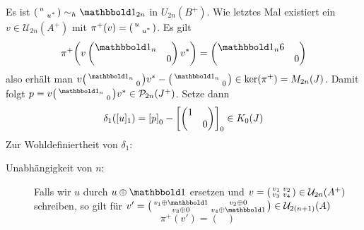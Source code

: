 \begin{beweis}[Idee]
	Es ist $\begin{psmallmatrix}u & \\ & u^* \end{psmallmatrix} \sim_h \ind_{2n}$ in $U_{2n}(B^+)$.
	Wie letztes Mal existiert ein $v \in \mathcal{U}_{2n}(A^+)$ mit $\pi^+(v)= \begin{psmallmatrix} u & \\ & u^* \end{psmallmatrix}$.
	Es gilt 
	\[
		\pi^+ \enbrace*{v \begin{pmatrix}
			\ind_{n} & \\ & 0
		\end{pmatrix} v^*} = \begin{pmatrix}
			\ind_n 6 \\ & 0
		\end{pmatrix}
	\]
	also erhält man $v \begin{psmallmatrix}
			\ind_{n} & \\ & 0
		\end{psmallmatrix} v^* - \begin{psmallmatrix}
			\ind_{n} & \\ & 0
		\end{psmallmatrix} \in \ker (\pi^+) = M_{2n}(J)$.
	Damit folgt
	\(
		p = v \begin{psmallmatrix}
			\ind_{n} & \\ & 0
		\end{psmallmatrix} v^* \in \kernedP_{2n}(J^+)
	\).
	Setze dann 
	\[
		\delta_1 \enbrace*{[u]_1} = \benbrace*{p}_0 - \benbrace*{\begin{pmatrix}
			1 & \\ & 0
		\end{pmatrix}}_0 \in K_0(J)
	\]
	Zur Wohldefiniertheit von $\delta_1$: 
	\begin{description}
		\item[Unabhängigkeit von $n$:] Falls wir $u$ durch $u \oplus \ind$ ersetzen und $v= \begin{psmallmatrix} v_1 & v_2 \\ v_3 & v_4 \end{psmallmatrix} \in \mathcal{U}_{2n}(A^+)$ schreiben, so gilt für 
		\(
			v' = \begin{psmallmatrix}
				v_1 \oplus \ind & v_2 \oplus 0\\
				v_3 \oplus 0 & v_4 \oplus \ind
			\end{psmallmatrix} \in \mathcal{U}_{2(n+1)}(A)
		\)
		\[
			\pi^+(v') = \begin{pmatrix}

\end{pmatrix}\]
\end{description}
\end{beweis}
